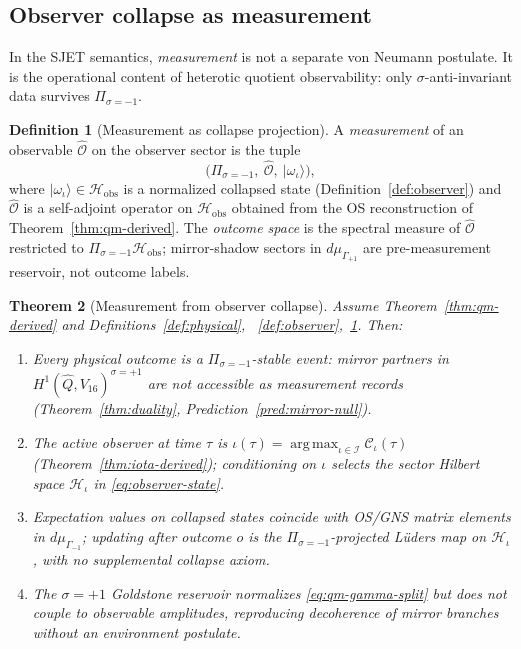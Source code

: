 \documentclass[11pt]{article}
\theoremstyle{plain}
\newtheorem{theorem}{Theorem}[section]
\theoremstyle{definition}
\newtheorem{definition}[theorem]{Definition}
\theoremstyle{remark}
\numberwithin{equation}{section}
\newcommand{\capacity}{\mathcal{C}}
\DeclareMathOperator{\argmax}{arg\,max}
\begin{document}
\subsection{Observer collapse as measurement}

In the SJET semantics, \emph{measurement} is not a separate von Neumann
postulate. It is the operational content of heterotic quotient
observability: only $\sigma$-anti-invariant data survives
$\Pi_{\sigma=-1}$.

\begin{definition}[Measurement as collapse projection]\label{def:measurement-collapse}
A \emph{measurement} of an observable $\hat{\mathcal{O}}$ on the observer
sector is the tuple
\begin{equation}\label{eq:measurement-tuple}
  \bigl(\Pi_{\sigma=-1},\ \hat{\mathcal{O}},\ |\omega_\iota\rangle\bigr),
\end{equation}
where $|\omega_\iota\rangle\in\mathcal{H}_{\mathrm{obs}}$ is a normalized
collapsed state (Definition~\ref{def:observer}) and $\hat{\mathcal{O}}$ is a
self-adjoint operator on $\mathcal{H}_{\mathrm{obs}}$ obtained from the OS
reconstruction of Theorem~\ref{thm:qm-derived}. The \emph{outcome space} is the
spectral measure of $\hat{\mathcal{O}}$ restricted to
$\Pi_{\sigma=-1}\mathcal{H}_{\mathrm{obs}}$; mirror-shadow sectors in
$d\mu_{\Gamma_{+1}}$ are pre-measurement reservoir, not outcome labels.
\end{definition}

\begin{theorem}[Measurement from observer collapse]
\label{thm:measurement-collapse}
Assume Theorem~\ref{thm:qm-derived} and Definitions~\ref{def:physical},
~\ref{def:observer},~\ref{def:measurement-collapse}. Then:
\begin{enumerate}[label=(\roman*),leftmargin=*]
  \item Every physical outcome is a $\Pi_{\sigma=-1}$-stable event: mirror
    partners in $H^1(\hat Q,V_{16})^{\sigma=+1}$ are not accessible as
    measurement records (Theorem~\ref{thm:duality},
    Prediction~\ref{pred:mirror-null}).
  \item The active observer at time $\tau$ is
    $\iota(\tau)=\argmax_{\iota\in\mathcal{I}}\capacity_\iota(\tau)$
    (Theorem~\ref{thm:iota-derived}); conditioning on $\iota$ selects the
    sector Hilbert space $\mathcal{H}_\iota$ in \eqref{eq:observer-state}.
  \item Expectation values on collapsed states coincide with OS/GNS matrix
    elements in $d\mu_{\Gamma_{-1}}$; updating after outcome $o$ is the
    $\Pi_{\sigma=-1}$-projected L\"uders map on $\mathcal{H}_\iota$, with no
    supplemental collapse axiom.
  \item The $\sigma=+1$ Goldstone reservoir normalizes
    \eqref{eq:qm-gamma-split} but does not couple to observable amplitudes,
    reproducing decoherence of mirror branches without an environment
    postulate.
\end{enumerate}
\end{theorem}
\end{document}
